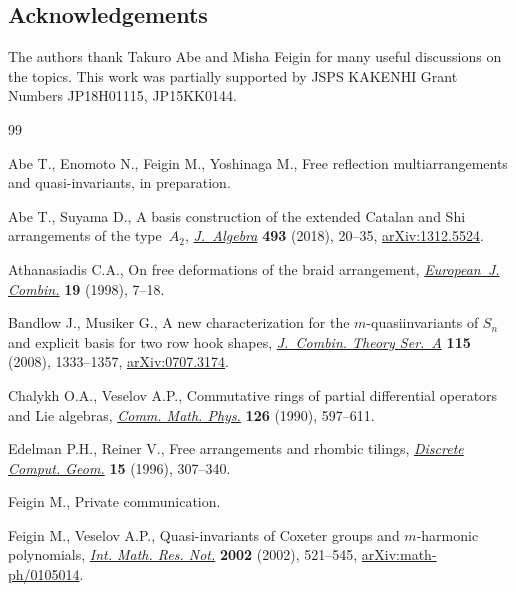 \documentclass[10pt,a4paper]{amsart}
\numberwithin{equation}{section}
\begin{document}
\subsection*{Acknowledgements}

The authors thank Takuro Abe and Misha Feigin for many useful discussions on the topics.
This work was partially supported by JSPS KAKENHI Grant Numbers JP18H01115, JP15KK0144.


\begin{thebibliography}{99}
\footnotesize\itemsep=0pt

Abe T., Enomoto N., Feigin M., Yoshinaga M., Free reflection multiarrangements
 and quasi-invariants, {i}n preparation.

Abe T., Suyama D., A basis construction of the extended {C}atalan and {S}hi
 arrangements of the type~{$A_2$}, \href{https://doi.org/10.1016/j.jalgebra.2017.09.024}{\textit{J.~Algebra}} \textbf{493} (2018),
 20--35, \href{https://arxiv.org/abs/1312.5524}{arXiv:1312.5524}.

Athanasiadis C.A., On free deformations of the braid arrangement,
 \href{https://doi.org/10.1006/eujc.1997.0149}{\textit{European~J. Combin.}} \textbf{19} (1998), 7--18.

Bandlow J., Musiker G., A new characterization for the {$m$}-quasiinvariants of
 {$S_n$} and explicit basis for two row hook shapes, \href{https://doi.org/10.1016/j.jcta.2008.01.011}{\textit{J.~Combin. Theory
 Ser.~A}} \textbf{115} (2008), 1333--1357, \href{https://arxiv.org/abs/0707.3174}{arXiv:0707.3174}.

Chalykh O.A., Veselov A.P., Commutative rings of partial differential operators
 and {L}ie algebras, \href{https://doi.org/10.1007/BF02125702}{\textit{Comm. Math. Phys.}} \textbf{126} (1990), 597--611.

Edelman P.H., Reiner V., Free arrangements and rhombic tilings,
 \href{https://doi.org/10.1007/BF02711498}{\textit{Discrete Comput. Geom.}} \textbf{15} (1996), 307--340.

Feigin M., Private communication.

Feigin M., Veselov A.P., Quasi-invariants of {C}oxeter groups and
 {$m$}-harmonic polynomials, \href{https://doi.org/10.1155/S1073792802106064}{\textit{Int. Math. Res. Not.}} \textbf{2002}
 (2002), 521--545, \href{https://arxiv.org/abs/math-ph/0105014}{arXiv:math-ph/0105014}.


\end{thebibliography}
\end{document}
